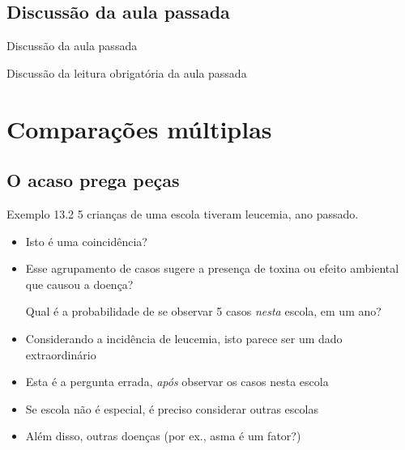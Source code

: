 \documentclass{beamer}
\begin{document}
\subsection{Discussão da aula passada}

\begin{frame}{Discussão da aula passada}
  \begin{block}{}
    Discussão da leitura obrigatória da aula passada
  \end{block}
\end{frame}

\section{Comparações múltiplas}

\subsection[Coincidências]{O acaso prega peças}

\begin{frame}
  \begin{exampleblock}{Exemplo 13.2}
    \small
    5 crianças de uma escola tiveram leucemia, ano passado.

    \begin{itemize}
    \item Isto é uma coincidência?
    \item Esse agrupamento de casos sugere a presença de toxina ou efeito ambiental que causou a doença?

      \bigskip
      \begin{exampleblock}{}
        Qual é a probabilidade de se observar 5 casos {\em nesta} escola, em um ano?
      \end{exampleblock}
    \end{itemize}
  \end{exampleblock}
\end{frame}

\begin{frame}
  \begin{itemize}
    \footnotesize
  \item Considerando a incidência de leucemia, isto parece ser um dado extraordinário
    \bigskip
    \bigskip
  \item Esta é a pergunta errada, {\em após} observar os casos nesta escola
  \item Se escola não é especial, é preciso considerar outras escolas
    \bigskip
    \bigskip
  \item Além disso, outras doenças (por ex., asma é um fator?)
  \end{itemize}
\end{frame}
\end{document}

